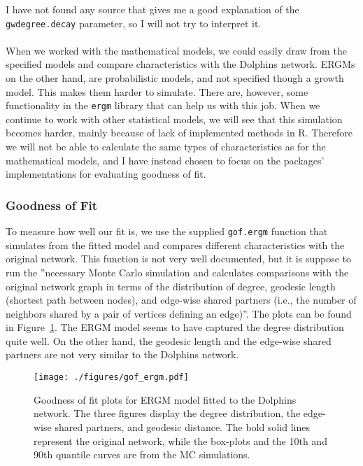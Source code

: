 \documentclass[11pt,a4paper]{article}
\begin{document}
I have not found any source that gives me a good explanation of the \verb+gwdegree.decay+ parameter, so I will not try to interpret it.
\\
\\
When we worked with the mathematical models, we could easily draw from the specified models and compare characteristics with the Dolphins network.
ERGMs on the other hand, are probabilistic models, and not specified though a growth model. This makes them harder to simulate. There are, however, some functionality in the \verb+ergm+ library that can help us with this job. 
When we continue to work with other statistical models, we will see that this simulation becomes harder, mainly because of lack of implemented methods in R. Therefore we will not be able to calculate the same types of characteristics as for the mathematical models, and I have instead chosen to focus on the packages' implementations for evaluating goodness of fit.

\subsubsection{Goodness of Fit}
To measure how well our fit is, we use the supplied \verb+gof.ergm+ function that simulates from the fitted model and compares different characteristics with the original network. This function is not very well documented, but it is suppose to run the ''necessary Monte Carlo simulation and calculates comparisons with the original network graph in terms of the distribution of degree, geodesic length (shortest path between nodes), and edge-wise shared partners (i.e., the number of neighbors shared by a pair of vertices defining an edge)''\citep{dolphins}.
The plots can be found in Figure~\ref{fig:gof_ergm}.
The ERGM model seems to have captured the degree distribution quite well. On the other hand, the geodesic length and the edge-wise shared partners are not very similar to the Dolphins network.
%
\begin{figure}[h!tbp]
    \begin{center}
        \texttt{[image: ./figures/gof\_ergm.pdf]}
    \end{center}
    \caption{Goodness of fit plots for ERGM model fitted to the Dolphins network. The three figures display the degree distribution, the edge-wise shared partners, and geodesic distance. The bold solid lines represent the original network, while the box-plots and the 10th and 90th quantile curves are from the MC simulations.}
    \label{fig:gof_ergm}
\end{figure}
\end{document}

